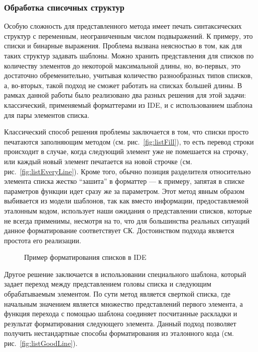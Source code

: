 \newpage
\subsubsection{Обработка списочных структур}

Особую сложность для представленного метода имеет
печать синтаксических структур с переменным, неограниченным числом
подвыражений. К примеру, это списки и бинарные выражения. Проблема вызвана
неясностью в том, как для таких структур задавать шаблоны. Можно хранить
представления для списков по количеству элементов
до некоторой максимальной длины, но,
во-первых, это достаточно обременительно, учитывая количество разнообразных
типов списков, а, во-вторых, такой подход не сможет работать на списках большей
длины. В рамках данной работы было реализовано два разных решения для этой
задачи: классический, применяемый форматтерами из IDE, и с использованием
шаблона для пары элементов списка.

Классический способ решения проблемы заключается в том, что
списки просто печатаются заполняющим методом (см. рис.~\ref{fig:listFill}),
то есть перевод строки происходит
в случае, когда следующий элемент уже не помешается на строчку, или каждый
новый элемент печатается на новой строчке (см. рис.~\ref{fig:listEveryLine}).
Кроме того, обычно позиция разделителя относительно элемента списка жестко
``зашита'' в форматтер --- к примеру,
запятая в списке параметров функции идет сразу же за параметром.
Этот метод явным образом выбивается из модели шаблонов, так как
вместо информации, предоставляемой эталонным кодом, использует наши
ожидания о представлении списков, которые не всегда применимы,
несмотря на то, что для большинства реальных ситуаций данное форматирование
соответствует СК.
Достоинством подхода является простота его реализации.

\begin{figure}[h!]
  \caption{Пример форматирования списков в IDE}
\end{figure}

Другое решение заключается в использовании специального шаблона, который
задает переход между представлением головы списка и следующим обрабатываемым
элементом. По сути метод является сверткой списка, где начальным значением
является множество представлений первого элемента, а функция перехода с помощью
шаблона соединяет
посчитанные раскладки и результат форматирования следующего элемента.
Данный подход позволяет получить нестандартные способы форматирования
из эталонного кода (см. рис.~\ref{fig:listGoodLine}).

